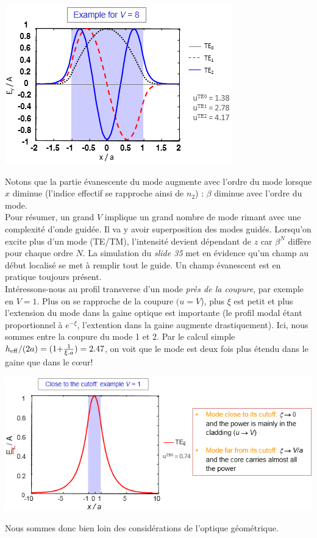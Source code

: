 \begin{enumerate}
\begin{center}
	\includegraphics[scale=0.75]{ch1/image16}
\end{center}

Notons que la partie évanescente du mode augmente avec l'ordre du mode lorsque $x$ diminue (l'indice
effectif se rapproche ainsi de $n_2$) : $\beta$ diminue avec l'ordre du mode.\\

Pour résumer, un grand $V$ implique un grand nombre de mode rimant avec une complexité d'onde guidée.
Il va y avoir superposition des modes guidés. Lorsqu'on excite plus d'un mode (TE/TM), l'intensité
devient dépendant de $z$ car $\beta^N$ diffère pour chaque ordre $N$. La simulation du \textit{slide 
35} met en évidence qu'un champ au début localisé se met à remplir tout le guide. Un champ évanescent
est en pratique toujours présent.\\

Intéressons-nous au profil transverse d'un mode \textit{près de la coupure}, par exemple en $V=1$. 
Plus on se rapproche de la coupure $(u=V$), plus $\xi$ est petit et plus l'extension du mode dans 
la gaine optique est importante (le profil modal étant proportionnel à $e^{-\xi}$, l'extention dans la
gaine augmente drastiquement). Ici, nous sommes
entre la coupure du mode 1 et 2. Par le calcul simple ${h_{{\rm{eff}}}}/(2a{\rm{)}} = {\rm{(1 + }}
\frac{{\rm{1}}}{{\xi .a}}{\rm{)  =  2}}{\rm{.47}}$, 
on voit que le mode est deux fois plus étendu dans le gaine que dans le cœur!
\begin{center}
	\includegraphics[scale=0.75]{ch1/image17}
\end{center}
Nous sommes donc bien loin des considérations de l'optique géométrique. 


\end{enumerate}
